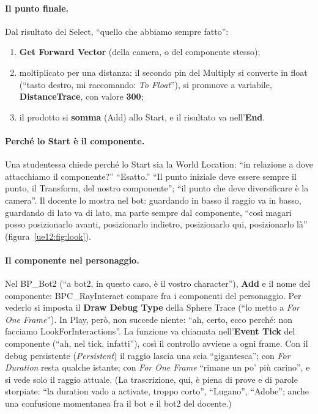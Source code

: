 \paragraph{Il punto finale.} Dal risultato del Select, ``quello che abbiamo sempre fatto'':
\begin{enumerate}
  \item \textbf{Get Forward Vector} (della camera, o del componente stesso);
  \item moltiplicato per una distanza: il secondo pin del Multiply si converte in float
        (``tasto destro, mi raccomando: \emph{To Float}''), si promuove a variabile,
        \textbf{DistanceTrace}, con valore \textbf{300};
  \item il prodotto si \textbf{somma} (Add) allo Start, e il risultato va nell'\textbf{End}.
\end{enumerate}

\paragraph{Perché lo Start è il componente.} Una studentessa chiede perché lo Start sia la
World Location: ``in relazione a dove attacchiamo il componente?'' ``Esatto.'' ``Il punto
iniziale deve essere sempre il punto, il Transform, del nostro componente''; ``il punto che
deve diversificare è la camera''. Il docente lo mostra nel bot: guardando in basso il
raggio va in basso, guardando di lato va di lato, ma parte sempre dal componente, ``così
magari posso posizionarlo avanti, posizionarlo indietro, posizionarlo qui, posizionarlo
là'' (figura~\ref{ue12:fig:look}).

\paragraph{Il componente nel personaggio.} Nel BP\_Bot2 (``a bot2, in questo caso, è il
vostro character''), \textbf{Add} e il nome del componente: BPC\_RayInteract compare fra i
componenti del personaggio. Per vederlo si imposta il \textbf{Draw Debug Type} della Sphere
Trace (``lo metto a \emph{For One Frame}''). In Play, però, non succede niente: ``ah,
certo, ecco perché: non facciamo LookForInteractions''. La funzione va chiamata
nell'\textbf{Event Tick} del componente (``ah, nel tick, infatti''), così il controllo
avviene a ogni frame. Con il debug persistente (\emph{Persistent}) il raggio lascia una scia
``gigantesca''; con \emph{For Duration} resta qualche istante; con \emph{For One Frame}
``rimane un po' più carino'', e si vede solo il raggio attuale. (La trascrizione, qui, è
piena di prove e di parole storpiate: ``la duration vado a activate, troppo corto'', ``Lugano'',
``Adobe''; anche una confusione momentanea fra il bot e il bot2 del docente.)

